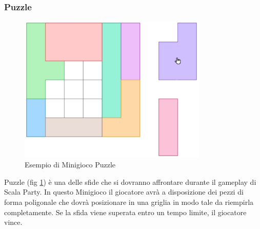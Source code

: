 \subsubsection{Puzzle}
\begin{figure}[h!]
\centering
\includegraphics[width=0.8\textwidth]{figures/puzzle.jpeg}
\caption{Esempio di Minigioco Puzzle}
\label{fig:puzzle}
\end{figure}
Puzzle (fig \ref{fig:puzzle}) è una delle sfide che si dovranno affrontare
durante il gameplay di Scala Party. In questo Minigioco il giocatore avrà 
a disposizione dei pezzi di forma poligonale che dovrà posizionare in una 
griglia in modo tale da riempirla completamente. Se la sfida viene 
superata entro un tempo limite, il giocatore vince.

